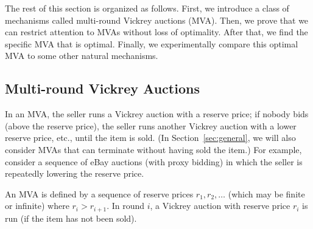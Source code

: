The rest of this section is organized as follows. First, we
introduce a class of mechanisms called multi-round Vickrey auctions (MVA).
Then,
we prove that we can restrict attention to MVAs without loss of optimality.
After that, we find the specific MVA that is optimal. Finally, we
experimentally compare this optimal MVA to some other natural mechanisms.

\subsection{Multi-round Vickrey Auctions}


In an MVA, the seller runs a Vickrey auction with a reserve price; if
nobody bids (above the reserve price), the seller runs another Vickrey
auction with a lower reserve price, etc., until the item is sold.  (In
Section~\ref{sec:general}, we will also consider MVAs that can terminate
without having sold the item.)
For example, consider a sequence of eBay auctions (with proxy bidding) in
which the seller is repeatedly lowering the reserve price.



\begin{definition}
  An MVA is defined by a sequence of reserve prices $r_1, r_2, \ldots$
  (which may be finite or infinite) where $r_i > r_{i+1}$. In round $i$, a
  Vickrey auction with reserve price $r_i$ is run (if the item has not been
  sold).
\end{definition}


